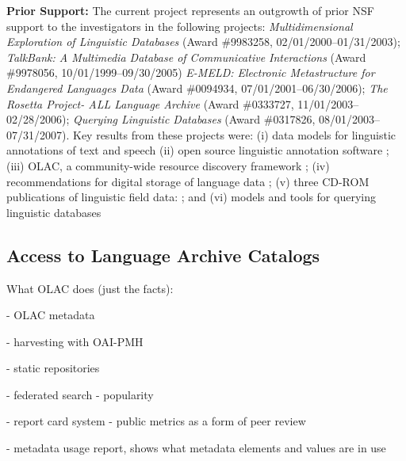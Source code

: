 \textbf{Prior Support:} The current project represents an outgrowth of
prior NSF support to the investigators in the following projects:
\textit{Multidimensional Exploration of Linguistic Databases}
  (Award \#9983258, 02/01/2000--01/31/2003);
\textit{TalkBank: A Multimedia Database of Communicative Interactions}
  (Award \#9978056, 10/01/1999--09/30/2005)
\textit{E-MELD: Electronic Metastructure for Endangered Languages Data}
  (Award \#0094934, 07/01/2001--06/30/2006);
\textit{The Rosetta Project- ALL Language Archive}
  (Award \#0333727, 11/01/2003--02/28/2006);
\textit{Querying Linguistic Databases}
  (Award \#0317826, 08/01/2003--07/31/2007).
Key results from these projects were:
(i) data models for linguistic annotations of text and speech
\citep{BirdLiberman01,MaedaBird00,GraffBird00,CottonBird02,CieriBird01,ATLAS00,BirdHarrington01}
(ii) open source linguistic annotation software
\citep{Bird01acl,MaedaBird02,BirdMaeda02,MaLee02};
(iii) OLAC, a community-wide resource discovery framework
\citep{BirdSimons00,BirdSimons00survey,BirdSimons01,BirdSimons02workshop,Simons02query,SimonsBird03lht,BirdSimons03chum,Simons03display,SimonsBird03llc,BirdSimons04metadata};
(iv) recommendations for digital storage of language data
\citep{BirdSimons03language};
(v) three CD-ROM publications of linguistic field data:
\citep{BirdBell01,Bird03paradigms,Bird03ngomba};
and
(vi) models and tools for querying linguistic databases
\citep{BirdBuneman01,BirdBunemanTan00,LaiBird04,Bird05planx,Bird06icde}




\subsection{Access to Language Archive Catalogs}


What OLAC does (just the facts):

- OLAC metadata \citep{BirdSimons04metadata}

- harvesting with OAI-PMH \citep{SimonsBird03lht}

- static repositories

- federated search \citep{HughesKamat05}
  - popularity \citep{Hughes06lrec}

- report card system
  - public metrics as a form of peer review

- metadata usage report, shows what metadata elements and values are in use


